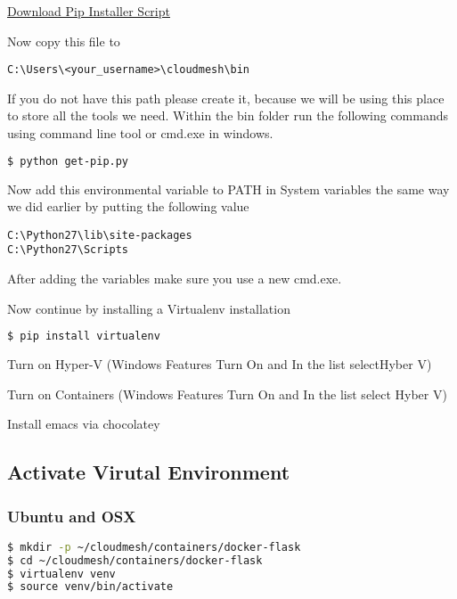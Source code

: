 \href{https://bootstrap.pypa.io/get-pip.py}{Download Pip Installer
Script}

Now copy this file to

\begin{lstlisting}
C:\Users\<your_username>\cloudmesh\bin
\end{lstlisting}

If you do not have this path please create it, because we will be using
this place to store all the tools we need. Within the bin folder run the
following commands using command line tool or cmd.exe in windows.

\begin{lstlisting}[language=bash]
$ python get-pip.py
\end{lstlisting}

Now add this environmental variable to PATH in System variables the same
way we did earlier by putting the following value

\begin{lstlisting}
C:\Python27\lib\site-packages
C:\Python27\Scripts
\end{lstlisting}

After adding the variables make sure you use a new cmd.exe.

Now continue by installing a Virtualenv installation

\begin{lstlisting}[language=bash]
$ pip install virtualenv 
\end{lstlisting}

Turn on Hyper-V (Windows Features Turn On and In the list selectHyber V)

Turn on Containers (Windows Features Turn On and In the list select
Hyber V)

Install emacs via chocolatey

\subsection{Activate Virutal Environment}

\subsubsection{Ubuntu and OSX}

\begin{lstlisting}[language=bash]
$ mkdir -p ~/cloudmesh/containers/docker-flask
$ cd ~/cloudmesh/containers/docker-flask
$ virtualenv venv
$ source venv/bin/activate
\end{lstlisting}

